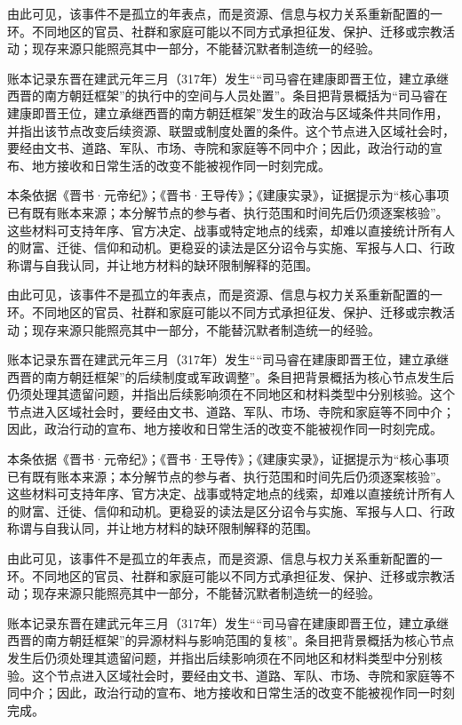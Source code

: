 由此可见，该事件不是孤立的年表点，而是资源、信息与权力关系重新配置的一环。不同地区的官员、社群和家庭可能以不同方式承担征发、保护、迁移或宗教活动；现存来源只能照亮其中一部分，不能替沉默者制造统一的经验。

账本记录东晋在建武元年三月（317年）发生““司马睿在建康即晋王位，建立承继西晋的南方朝廷框架”的执行中的空间与人员处置”。条目把背景概括为“司马睿在建康即晋王位，建立承继西晋的南方朝廷框架”发生的政治与区域条件共同作用，并指出该节点改变后续资源、联盟或制度处置的条件。这个节点进入区域社会时，要经由文书、道路、军队、市场、寺院和家庭等不同中介；因此，政治行动的宣布、地方接收和日常生活的改变不能被视作同一时刻完成。

本条依据《晋书·元帝纪》；《晋书·王导传》；《建康实录》，证据提示为“核心事项已有既有账本来源；本分解节点的参与者、执行范围和时间先后仍须逐案核验”。这些材料可支持年序、官方决定、战事或特定地点的线索，却难以直接统计所有人的财富、迁徙、信仰和动机。更稳妥的读法是区分诏令与实施、军报与人口、行政称谓与自我认同，并让地方材料的缺环限制解释的范围。

由此可见，该事件不是孤立的年表点，而是资源、信息与权力关系重新配置的一环。不同地区的官员、社群和家庭可能以不同方式承担征发、保护、迁移或宗教活动；现存来源只能照亮其中一部分，不能替沉默者制造统一的经验。

账本记录东晋在建武元年三月（317年）发生““司马睿在建康即晋王位，建立承继西晋的南方朝廷框架”的后续制度或军政调整”。条目把背景概括为核心节点发生后仍须处理其遗留问题，并指出后续影响须在不同地区和材料类型中分别核验。这个节点进入区域社会时，要经由文书、道路、军队、市场、寺院和家庭等不同中介；因此，政治行动的宣布、地方接收和日常生活的改变不能被视作同一时刻完成。

本条依据《晋书·元帝纪》；《晋书·王导传》；《建康实录》，证据提示为“核心事项已有既有账本来源；本分解节点的参与者、执行范围和时间先后仍须逐案核验”。这些材料可支持年序、官方决定、战事或特定地点的线索，却难以直接统计所有人的财富、迁徙、信仰和动机。更稳妥的读法是区分诏令与实施、军报与人口、行政称谓与自我认同，并让地方材料的缺环限制解释的范围。

由此可见，该事件不是孤立的年表点，而是资源、信息与权力关系重新配置的一环。不同地区的官员、社群和家庭可能以不同方式承担征发、保护、迁移或宗教活动；现存来源只能照亮其中一部分，不能替沉默者制造统一的经验。

账本记录东晋在建武元年三月（317年）发生““司马睿在建康即晋王位，建立承继西晋的南方朝廷框架”的异源材料与影响范围的复核”。条目把背景概括为核心节点发生后仍须处理其遗留问题，并指出后续影响须在不同地区和材料类型中分别核验。这个节点进入区域社会时，要经由文书、道路、军队、市场、寺院和家庭等不同中介；因此，政治行动的宣布、地方接收和日常生活的改变不能被视作同一时刻完成。

